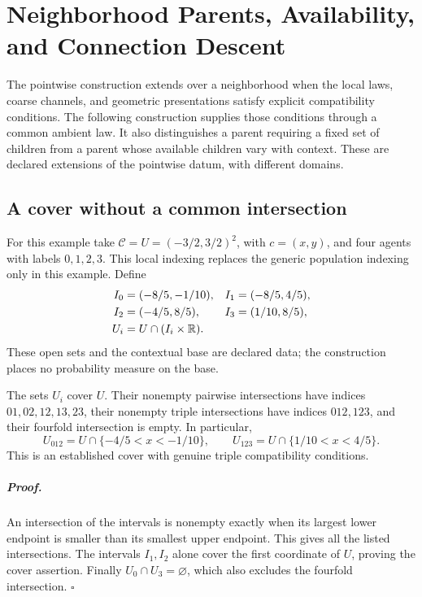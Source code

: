 \chapter{Neighborhood Parents, Availability, and Connection Descent}
\label{ch:neighborhood-parents}

The pointwise construction extends over a neighborhood when the local laws,
coarse channels, and geometric presentations satisfy explicit compatibility
conditions. The following construction supplies those conditions through a
common ambient law. It also distinguishes a parent requiring a fixed set of
children from a parent whose available children vary with context. These are
declared extensions of the pointwise datum, with different domains.

\section{A cover without a common intersection}
\label{sec:rg-cover-domains}

For this example take \(\mathcal C=U=(-3/2,3/2)^2\), with
\(c=(x,y)\), and four agents with labels \(0,1,2,3\). This local indexing
replaces the generic population indexing only in this example. Define
\begin{equation}
\begin{aligned}
 I_0&=(-8/5,-1/10),& I_1&=(-8/5,4/5),\\
 I_2&=(-4/5,8/5),& I_3&=(1/10,8/5),\\
 U_i&=U\cap(I_i\times\mathbb R).
\end{aligned}
\label{eq:rg-cover-open-domains}
\end{equation}
These open sets and the contextual base are declared data; the construction
places no probability measure on the base. 

The sets \(U_i\) cover \(U\). Their nonempty pairwise intersections have
indices \(01,02,12,13,23\), their nonempty triple intersections have indices
\(012,123\), and their fourfold intersection is empty. In particular,
\begin{equation}
 U_{012}=U\cap\{-4/5<x<-1/10\},\qquad
 U_{123}=U\cap\{1/10<x<4/5\}.
\label{eq:rg-cover-triples}
\end{equation}
This is an established cover with genuine triple compatibility conditions.

\paragraph{Proof.}
An intersection of the intervals is nonempty exactly when its largest lower
endpoint is smaller than its smallest upper endpoint. This gives all the
listed intersections. The intervals \(I_1,I_2\) alone cover the first
coordinate of \(U\), proving the cover assertion. Finally
\(U_0\cap U_3=\varnothing\), which also excludes the fourfold intersection.
\(\square\)

